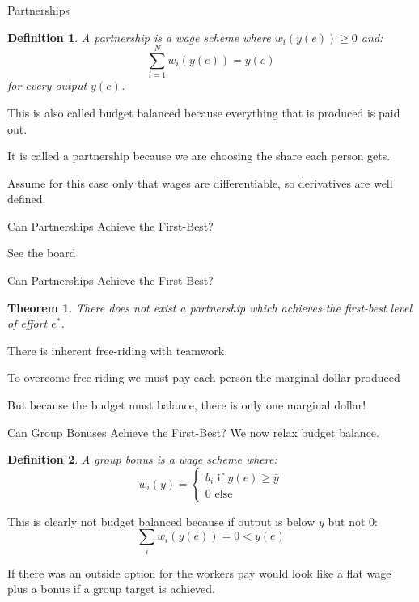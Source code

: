 \documentclass[aspectratio=169,usenames,dvipsnames]{beamer}
\newenvironment{wideitemize}{\itemize\addtolength{\itemsep}{10pt}}{\enditemize}
\newtheorem*{theorem*}{Theorem}
\newtheorem*{definition*}{Definition}
\begin{document}
\begin{frame}{Partnerships}

\begin{definition*}
    A partnership is a wage scheme where $w_i(y(e))\geq 0$ and:
    \[\sum_{i=1}^N w_i(y(e))=y(e)\]
    for every output $y(e)$.
\end{definition*}

    \begin{wideitemize}
        \item This is also called budget balanced because everything that is produced is paid out.
        \item It is called a partnership because we are choosing the share each person gets.
        \item Assume for this case only that wages are differentiable, so derivatives are well defined.
    \end{wideitemize}
\end{frame}

\begin{frame}{Can Partnerships Achieve the First-Best?}

\Huge See the board
    
\end{frame}


\begin{frame}{Can Partnerships Achieve the First-Best?}

\begin{theorem*}
    There does not exist a partnership which achieves the first-best level of effort $e^*$.
\end{theorem*}
    \begin{wideitemize}
        \item There is inherent free-riding with teamwork.
        \item To overcome free-riding we must pay each person the marginal dollar produced
        \item But because the budget must balance, there is only one marginal dollar!
    \end{wideitemize}
\end{frame}


\begin{frame}{Can Group Bonuses Achieve the First-Best?}
We now relax budget balance.
\begin{definition*}
    A group bonus is a wage scheme where:
    \[w_i(y)=\begin{cases}b_i \text{ if } y(e)\geq \bar y \\
    0 \text{ else }
    \end{cases}\]
\end{definition*}
    \begin{wideitemize}
        \item This is clearly not budget balanced because if output is below $\bar y$ but not 0:
        \[\sum_i w_i(y(e))=0 < y(e)\]
        \item If there was an outside option for the workers pay would look like a flat wage plus a bonus if a group target is achieved.
    \end{wideitemize}
\end{frame}
\end{document}

